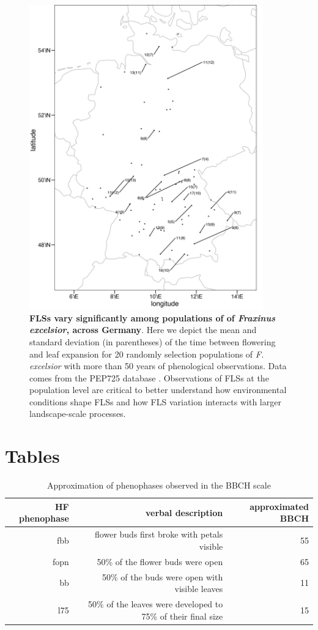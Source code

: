 \documentclass[11pt]{article}
\begin{document}
\begin{figure}[H]
\centering
\includegraphics[width=0.9\textwidth]{..//..//popmap.png} 
  \caption{\textbf{FLSs vary significantly among populations of of \emph{Fraxinus excelsior}, across Germany}. Here we depict the mean and standard deviation (in parentheses) of the time between flowering and leaf expansion for 20 randomly selection populations of \emph{F. excelsior} with more than 50 years of phenological observations. Data comes from the PEP725 database \citep{PEP725}. Observations of FLSs at the population level are critical to better understand how environmental conditions shape FLSs and how FLS variation interacts with larger landscape-scale processes.}
  \label{fig:popmap}
    \end{figure}

\section*{Tables}

\begin{table}[H]
\centering
\begin{tabular}{rrr}
  \hline
  HF phenophase & verbal description & approximated BBCH  \\ 
  \hline
  fbb & flower buds first broke with petals visible & 55 \\
  fopn &  50\% of the flower buds were open & 65 \\
 bb &  50\% of the buds were open with visible leaves & 11 \\
 l75 & 50\% of the leaves were developed to 75\% of their final size &  15 \\
   \hline
\end{tabular}
\caption{Approximation of phenophases observed in \citep{OKeefe2015} the BBCH scale \citep{Finn2007}} 
\label{tab:BBCH2HF}
\end{table}
\end{document}
